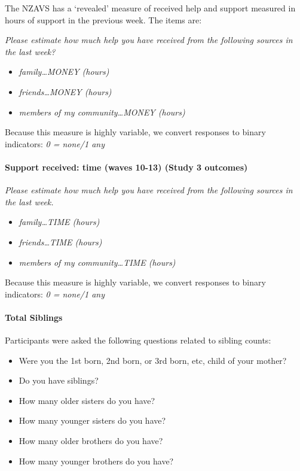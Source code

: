 \documentclass[
  single column]{article}
\let\oldparagraph\paragraph
\renewcommand{\paragraph}[1]{\oldparagraph{#1}\mbox{}}
\providecommand{\tightlist}{%
  \setlength{\itemsep}{0pt}\setlength{\parskip}{0pt}}\usepackage{longtable,booktabs,array}
\begin{document}
The NZAVS has a `revealed' measure of received help and support measured
in hours of support in the previous week. The items are:

\emph{Please estimate how much help you have received from the following
sources in the last week?}

\begin{itemize}
\tightlist
\item
  \emph{family\ldots MONEY (hours)}
\item
  \emph{friends\ldots MONEY (hours)}
\item
  \emph{members of my community\ldots MONEY (hours)}
\end{itemize}

Because this measure is highly variable, we convert responses to binary
indicators: \emph{0 = none/1 any}

\paragraph{Support received: time (waves 10-13) (Study 3
outcomes)}\label{support-received-time-waves-10-13-study-3-outcomes}

\emph{Please estimate how much help you have received from the following
sources in the last week.}

\begin{itemize}
\tightlist
\item
  \emph{family\ldots TIME (hours)}
\item
  \emph{friends\ldots TIME (hours)}
\item
  \emph{members of my community\ldots TIME (hours)}
\end{itemize}

Because this measure is highly variable, we convert responses to binary
indicators: \emph{0 = none/1 any}

\paragraph{Total Siblings}\label{total-siblings}

Participants were asked the following questions related to sibling
counts:

\begin{itemize}
\tightlist
\item
  Were you the 1st born, 2nd born, or 3rd born, etc, child of your
  mother?
\item
  Do you have siblings?
\item
  How many older sisters do you have?
\item
  How many younger sisters do you have?
\item
  How many older brothers do you have?
\item
  How many younger brothers do you have?
\end{itemize}
\end{document}
